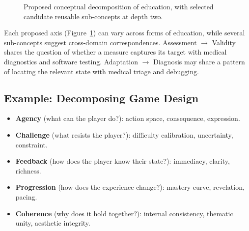 \documentclass[11pt]{article}
\begin{document}
\begin{figure}[H]
\centering
{}
\caption{Proposed conceptual decomposition of education, with selected candidate reusable sub-concepts at depth two.}
\label{fig:education-tree}
\end{figure}

Each proposed axis (Figure~\ref{fig:education-tree}) can vary across forms of education, while several sub-concepts suggest cross-domain correspondences. Assessment $\to$ Validity shares the question of whether a measure captures its target with medical diagnostics and software testing. Adaptation $\to$ Diagnosis may share a pattern of locating the relevant state with medical triage and debugging.

\subsection{Example: Decomposing Game Design}

\begin{itemize}[leftmargin=1.5em]
\item \textbf{Agency} (what can the player do?): action space, consequence, expression.
\item \textbf{Challenge} (what resists the player?): difficulty calibration, uncertainty, constraint.
\item \textbf{Feedback} (how does the player know their state?): immediacy, clarity, richness.
\item \textbf{Progression} (how does the experience change?): mastery curve, revelation, pacing.
\item \textbf{Coherence} (why does it hold together?): internal consistency, thematic unity, aesthetic integrity.
\end{itemize}
\end{document}
